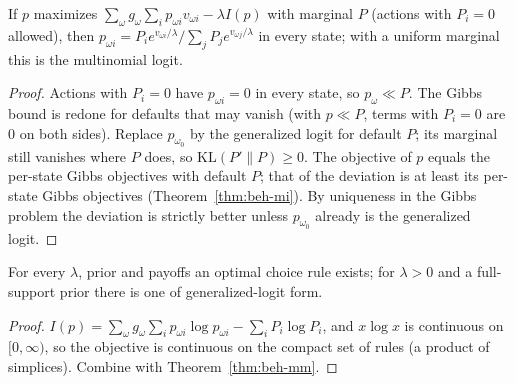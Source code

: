 \begin{theorem}
\label{thm:beh-mm}
\leanok
{}
If $p$ maximizes $\sum_\omega g_\omega\sum_ip_{\omega i}v_{\omega i}-\lambda I(p)$ with marginal $P$
(actions with $P_i=0$ allowed), then $p_{\omega i}=P_ie^{v_{\omega i}/\lambda}/\sum_jP_je^{v_{\omega j}/\lambda}$ in every state; with a
uniform marginal this is the multinomial logit.
\end{theorem}
\begin{proof}
\leanok
Actions with $P_i=0$ have $p_{\omega i}=0$ in every state, so $p_\omega\ll P$. The Gibbs bound is redone
for defaults that may vanish (with $p\ll P$, terms with $P_i=0$ are $0$ on both sides). Replace
$p_{\omega_0}$ by the generalized logit for default $P$; its marginal still vanishes where $P$ does, so
$\mathrm{KL}(P'\|P)\ge0$. The objective of $p$ equals the per-state Gibbs
objectives with default $P$; that of the deviation is at least its per-state Gibbs objectives
(Theorem~\ref{thm:beh-mi}). By uniqueness in the Gibbs problem the deviation is strictly better unless
$p_{\omega_0}$ already is the generalized logit.
\end{proof}

\begin{theorem}
\label{thm:beh-ri-exist}
\leanok
{}
For every $\lambda$, prior and payoffs an optimal choice rule exists; for $\lambda>0$ and a full-support prior there is
one of generalized-logit form.
\end{theorem}
\begin{proof}
\leanok
$I(p)=\sum_\omega g_\omega\sum_ip_{\omega i}\log p_{\omega i}-\sum_iP_i\log P_i$, and $x\log x$ is continuous on
$[0,\infty)$, so the objective is continuous on the compact set of rules (a product of simplices). Combine with
Theorem~\ref{thm:beh-mm}.
\end{proof}


